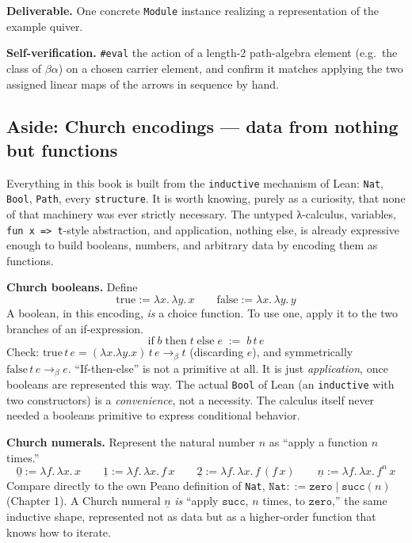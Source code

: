 \textbf{Deliverable.} One concrete \texttt{Module} instance realizing a representation of the example quiver.

\textbf{Self-verification.} \texttt{\#eval} the action of a length-2 path-algebra element (e.g.~the class of \(\beta\alpha\)) on a chosen carrier element, and confirm it matches applying the two assigned linear maps of the arrows in sequence by hand.

\subsection{Aside: Church encodings --- data from nothing but functions}\label{sec:13-next-steps:03-next-projects:7}

Everything in this book is built from the \texttt{inductive} mechanism of Lean: \texttt{Nat}, \texttt{Bool}, \texttt{Path}, every \texttt{structure}. It is worth knowing, purely as a curiosity, that none of that machinery was ever strictly necessary. The untyped λ-calculus, variables, \texttt{fun x => t}-style abstraction, and application, nothing else, is already expressive enough to build booleans, numbers, and arbitrary data by encoding them as functions.

\textbf{Church booleans.} Define \[
\mathrm{true} := \lambda x.\, \lambda y.\, x
\qquad
\mathrm{false} := \lambda x.\, \lambda y.\, y
\] A boolean, in this encoding, \emph{is} a choice function. To use one, apply it to the two branches of an if-expression. \[
\mathrm{if}\; b \;\mathrm{then}\; t \;\mathrm{else}\; e \;:=\; b\, t\, e
\] Check: \(\mathrm{true}\, t\, e = (\lambda x.\lambda y. x)\, t\, e \longrightarrow_\beta t\) (discarding \(e\)), and symmetrically \(\mathrm{false}\, t\, e \longrightarrow_\beta e\). ``If-then-else'' is not a primitive at all. It is just \emph{application}, once booleans are represented this way. The actual \texttt{Bool} of Lean (an \texttt{inductive} with two constructors) is a \emph{convenience}, not a necessity. The calculus itself never needed a booleans primitive to express conditional behavior.

\textbf{Church numerals.} Represent the natural number \(n\) as ``apply a function \(n\) times.'' \[
\underline{0} := \lambda f.\, \lambda x.\, x
\qquad
\underline{1} := \lambda f.\, \lambda x.\, f\, x
\qquad
\underline{2} := \lambda f.\, \lambda x.\, f\,(f\, x)
\qquad
\underline{n} := \lambda f.\, \lambda x.\, f^n\, x
\] Compare directly to the own Peano definition of \texttt{Nat}, \(\mathtt{Nat} ::= \mathtt{zero} \mid \mathtt{succ}(n)\) (Chapter 1). A Church numeral \(\underline{n}\) \emph{is} ``apply \(\mathtt{succ}\), \(n\) times, to \(\mathtt{zero}\),'' the same inductive shape, represented not as data but as a higher-order function that knows how to iterate.

